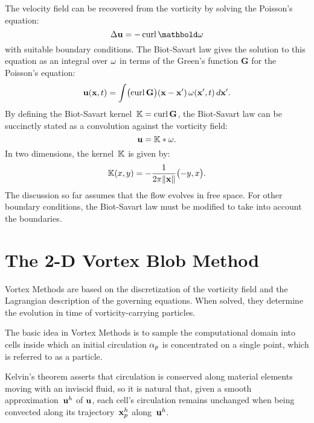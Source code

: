 The velocity field can be recovered from the vorticity by solving the Poisson's equation:
\begin{equation}
  \lapl\vel = -\curl\mathbold\vort
\end{equation}
with suitable boundary conditions.
The Biot-Savart law gives the solution to this equation as an integral over \(\omega\)
in terms of the Green's function \(\mathbf G\) for the Poisson's equation:
\begin{equation}
  \label{eq:integral-biot-savart-law}
  \mathbf u(\mathbf x, t) = \int\bigl(\operatorname{curl}\mathbf G\bigr)(\mathbf x - \mathbf x')\,\omega(\mathbf x', t)\,d\mathbf x'.
\end{equation}
By defining the Biot-Savart kernel~\(\mathbb{K} = \operatorname{curl}\mathbf G\),
the Biot-Savart law can be succinctly stated as a convolution against the vorticity field:
\begin{equation}
  \label{eq:biot-savart-law}
  \mathbf u = \mathbb{K} * \omega.
\end{equation}
In two dimensions, the kernel~\(\mathbb{K}\) is given by:
\begin{equation}
  \label{eq:2d-biot-savart-kernel}
  \mathbb{K}(x, y) = -\frac{1}{2\pi\lVert\mathbf x\rVert}\bigl(-y, x\bigr).
\end{equation}
The discussion so far assumes that the flow evolves in free space.
For other boundary conditions, the Biot-Savart law must be modified
to take into account the boundaries.



\section{The 2-D Vortex Blob Method}
\label{sec:vortex-blob-method}

Vortex Methods are based on the discretization of the vorticity field
and the Lagrangian description of the governing equations.
When solved, they determine the evolution in time of vorticity-carrying particles.

The basic idea in Vortex Methods is
to sample the computational domain into cells
inside which an initial circulation \(\alpha_p\) is concentrated on a single point,
which is referred to as a particle.

Kelvin's theorem asserts that circulation is conserved
along material elements moving with an inviscid fluid,
so it is natural that,
given a smooth approximation~\(\mathbf u^h\) of \(\mathbf u\),
each cell's circulation remains unchanged when being convected
along its trajectory~\(\mathbf x_p^h\) along~\(\mathbf u^h\).

